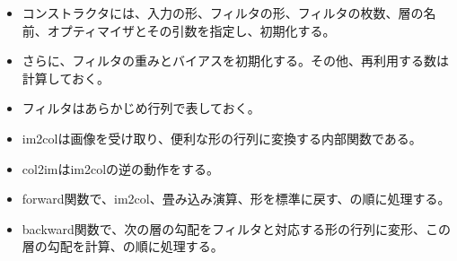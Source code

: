 \documentclass[platex,dvipdfmx]{jsarticle}
\begin{document}
\begin{itemize}
  \item コンストラクタには、入力の形、フィルタの形、フィルタの枚数、層の名前、オプティマイザとその引数を指定し、初期化する。
  \item さらに、フィルタの重みとバイアスを初期化する。その他、再利用する数は計算しておく。
  \item フィルタはあらかじめ行列で表しておく。
  \item im2colは画像を受け取り、便利な形の行列に変換する内部関数である。
  \item col2imはim2colの逆の動作をする。
  \item forward関数で、im2col、畳み込み演算、形を標準に戻す、の順に処理する。
  \item backward関数で、次の層の勾配をフィルタと対応する形の行列に変形、この層の勾配を計算、の順に処理する。
\end{itemize}
\end{document}
